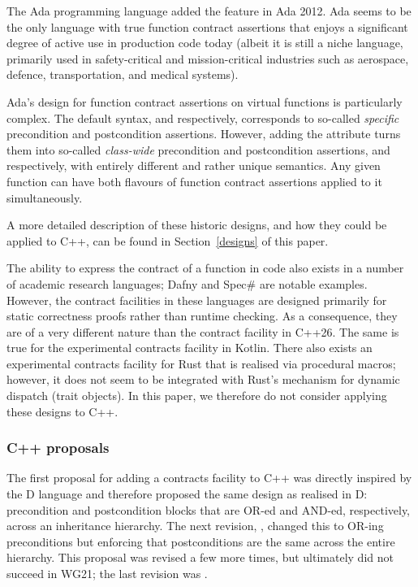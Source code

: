 The Ada programming language added the feature in Ada 2012. Ada seems to be the only language with true function contract assertions that enjoys a significant degree of active use in production code today (albeit it is still a niche language, primarily used in safety-critical and mission-critical industries such as aerospace, defence, transportation, and medical systems).

Ada's design for function contract assertions on virtual functions is particularly complex. The default syntax,  and  respectively, corresponds to so-called \emph{specific} precondition and postcondition assertions. However, adding the  attribute turns them into so-called  \emph{class-wide} precondition and postcondition assertions,  and  respectively, with entirely different and rather unique semantics. Any given function can have both flavours of function contract assertions applied to it simultaneously.

A more detailed description of these historic designs, and how they could be applied to C++, can be found in Section~\ref{designs} of this paper.

The ability to express the contract of a function in code also exists in a number of academic research languages; Dafny and Spec\# are notable examples. However, the contract facilities in these languages are designed primarily for static correctness proofs rather than runtime checking. As a consequence, they are of a very different nature than the contract facility in C++26. The same is true for the experimental contracts facility in Kotlin. There also exists an experimental contracts facility for Rust that is realised via procedural macros; however, it does not seem to be integrated with Rust's mechanism for dynamic dispatch (trait objects). In this paper, we therefore do not consider applying these designs to C++.

\subsubsection{C++ proposals}

The first proposal for adding a contracts facility to C++ \cite{N1613} was directly inspired by the D language and therefore proposed the same design as realised in D: precondition and postcondition blocks that are OR-ed and AND-ed, respectively, across an inheritance hierarchy. The next revision, \cite{N1669}, changed this to OR-ing preconditions but enforcing that postconditions are the same across the entire hierarchy.
This proposal was revised a few more times, but ultimately did not succeed in WG21; the last revision was \cite{N1962}.

